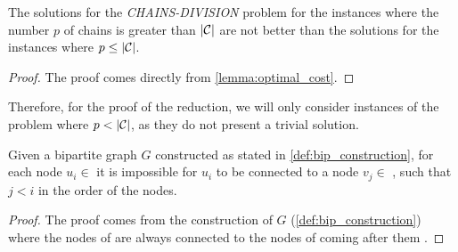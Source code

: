 \begin{claim} \label{claim:p_less_than_E}
    The solutions for the \textit{CHAINS-DIVISION} problem for the instances where the number $p$ of chains is greater than $|\mathcal{C}|$ are not better than the solutions for the instances where $p \leq |\mathcal{C}|$.
\end{claim}

\begin{proof}
    The proof comes directly from \cref{lemma:optimal_cost}. 
\end{proof}

Therefore, for the proof of the reduction, we will only consider instances of the problem where $p < |\mathcal{C}|$, as they do not present a trivial solution.

\begin{lemma} \label{lemma:greater_nodes}
    Given a bipartite graph $G$ constructed as stated in \cref{def:bip_construction}, for each node $u_i \in$  it is impossible for $u_i$ to be connected to a node $v_j \in$ , such that $j < i$ in the order of the nodes.
\end{lemma}

\begin{proof}
    The proof comes from the construction of $G$ (\cref{def:bip_construction}) where the nodes of  are always connected to the nodes of  coming after them .
\end{proof}

